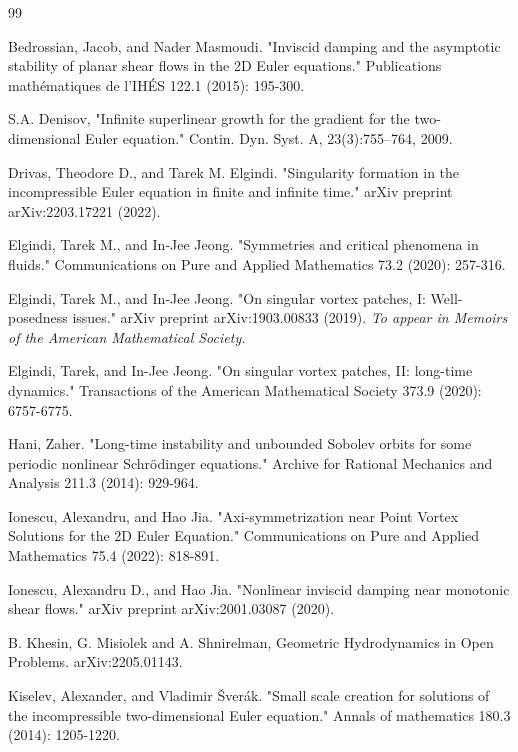 \documentclass[10pt]{article}
\numberwithin{equation}{section}
\theoremstyle{plain}
\theoremstyle{definition}
\numberwithin{equation}{section}
\begin{document}
\begin{thebibliography}{99}

Bedrossian, Jacob, and Nader Masmoudi. "Inviscid damping and the asymptotic stability of planar shear flows in the 2D Euler equations." Publications mathématiques de l'IHÉS 122.1 (2015): 195-300.

S.A. Denisov, "Infinite superlinear growth for the gradient for the two-dimensional Euler equation."
Contin. Dyn. Syst. A, 23(3):755–764, 2009.

Drivas, Theodore D., and Tarek M. Elgindi. "Singularity formation in the incompressible Euler equation in finite and infinite time." arXiv preprint arXiv:2203.17221 (2022).

Elgindi, Tarek M., and In‐Jee Jeong. "Symmetries and critical phenomena in fluids." Communications on Pure and Applied Mathematics 73.2 (2020): 257-316.

Elgindi, Tarek M., and In-Jee Jeong. "On singular vortex patches, I: Well-posedness issues." arXiv preprint arXiv:1903.00833 (2019). \emph{To appear in Memoirs of the American Mathematical Society.} 

Elgindi, Tarek, and In-Jee Jeong. "On singular vortex patches, II: long-time dynamics." Transactions of the American Mathematical Society 373.9 (2020): 6757-6775.

Hani, Zaher. "Long-time instability and unbounded Sobolev orbits for some periodic nonlinear Schrödinger equations." Archive for Rational Mechanics and Analysis 211.3 (2014): 929-964.

Ionescu, Alexandru, and Hao Jia. "Axi‐symmetrization near Point Vortex Solutions for the 2D Euler Equation." Communications on Pure and Applied Mathematics 75.4 (2022): 818-891.

Ionescu, Alexandru D., and Hao Jia. "Nonlinear inviscid damping near monotonic shear flows." arXiv preprint arXiv:2001.03087 (2020).

B. Khesin, G. Misiolek and A. Shnirelman,
Geometric Hydrodynamics in Open Problems.
{\it} {	arXiv:2205.01143}.

Kiselev, Alexander, and Vladimir Šverák. "Small scale creation for solutions of the incompressible two-dimensional Euler equation." Annals of mathematics 180.3 (2014): 1205-1220.


\end{thebibliography}
\end{document}
